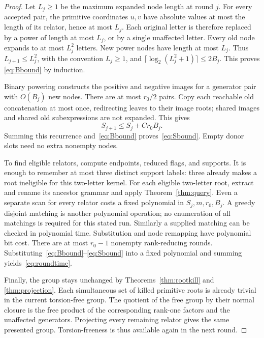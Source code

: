 \documentclass[11pt,letterpaper]{article}
\theoremstyle{definition}
\begin{document}
\begin{proof}
Let $L_j\geq1$ be the maximum expanded node length at round $j$.
For every accepted pair, the primitive coordinates $u,v$ have absolute
values at most the length of its relator, hence at most $L_j$. Each original
letter is therefore replaced by a power of length at most $L_j$, or by a
single unaffected letter. Every old node expands to at most $L_j^2$ letters.
New power nodes have length at most $L_j$. Thus
$L_{j+1}\leq L_j^2$, with the convention $L_j\geq1$, and
$\lceil\log_2(L_j^2+1)\rceil\leq 2B_j$. This proves
\eqref{eq:Bbound} by induction.

Binary powering constructs the positive and negative images for a generator
pair with $O(B_j)$ new nodes. There are at most $r_0/2$ pairs. Copy each
reachable old concatenation at most once, redirecting leaves to their image
roots; shared images and shared old subexpressions are not expanded. This
gives
\[
 S_{j+1}\leq S_j+C r_0B_j.
\]
Summing this recurrence and~\eqref{eq:Bbound} proves~\eqref{eq:Sbound}.
Empty donor slots need no extra nonempty nodes.

To find eligible relators, compute endpoints, reduced flags, and supports.
It is enough to remember at most three distinct support labels: three
already makes a root ineligible for this two-letter kernel. For each
eligible two-letter root, extract and rename its ancestor grammar and apply
Theorem~\ref{thm:query}. Even a separate scan for every relator costs a fixed
polynomial in $S_j,m,r_0,B_j$. A greedy disjoint matching is another polynomial
operation; no enumeration of all matchings is required for this stated run.
Similarly a supplied matching can be checked in polynomial time. Substitution
and node remapping have polynomial bit cost. There are at most $r_0-1$
nonempty rank-reducing rounds. Substituting~\eqref{eq:Bbound}--\eqref{eq:Sbound}
into a fixed polynomial and summing yields~\eqref{eq:roundtime}.

Finally, the group stays unchanged by Theorems~\ref{thm:rootkill} and
\ref{thm:projection}. Each simultaneous set of killed primitive roots is
already trivial in the current torsion-free group. The quotient of the free
group by their normal closure is the free product of the corresponding
rank-one factors and the unaffected generators. Projecting every remaining
relator gives the same presented group. Torsion-freeness is thus available
again in the next round.
\end{proof}
\end{document}
